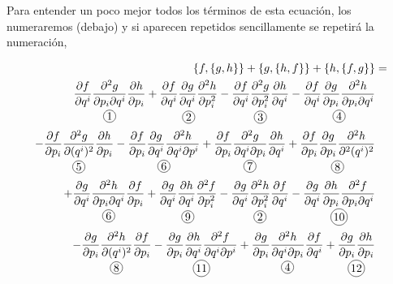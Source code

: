 \documentclass[a4paper,10pt]{article}
\numberwithin{equation}{section}
\newcommand{\circled}[2][]{%
  \tikz[baseline=(char.base)]{%
    \node[shape = circle, draw, inner sep = 1pt]
    (char) {\phantom{\ifblank{#1}{#2}{#1}}};%
    \node at (char.center) {\makebox[0pt][c]{#2}};}}
\begin{document}
Para entender un poco mejor todos los términos de esta ecuación, los numeraremos
(debajo) y si aparecen repetidos sencillamente se repetirá la numeración,

\begin{align}
\begin{split}
   \{f,\{g,h\}\} + \{g,\{h,f\}\} + \{h,\{f,g\}\} &= \\
 \underset{\circled{1}}{\frac{\partial f}{\partial q^i}
  \frac{\partial^2 g}{\partial p_i\partial q^i}\frac{\partial h}{\partial p_i}} 
  + \underset{\circled{2}}{\frac{\partial f}{\partial q^i}
  \frac{\partial g}{\partial q^i}\frac{\partial^2 h}{\partial p_i^2}} 
  - \underset{\circled{3}}{\frac{\partial f}{\partial q^i}
  \frac{\partial^2 g}{\partial p_i^2}\frac{\partial h}{\partial q^i}}
  -\underset{\circled{4}}{\frac{\partial f}{\partial q^i} 
  \frac{\partial g}{\partial p_i}\frac{\partial^2 h}{\partial p_i \partial q^i}} \\
  - \underset{\circled{5}}{\frac{\partial f}{\partial p_i}\frac{\partial^2 g}{\partial (q^i)^2}
  \frac{\partial h}{\partial p_i}} - \underset{\circled{6}}{\frac{\partial f}{\partial p_i}\frac{\partial g}{\partial q^i}
  \frac{\partial^2 h}{\partial q^i\partial p^i}} + \underset{\circled{7}}{\frac{\partial f}{\partial p_i}\frac{\partial^2 g}{\partial q^i\partial p_i}
  \frac{\partial h}{\partial q^i}} + \underset{\circled{8}}{\frac{\partial f}{\partial p_i}\frac{\partial g}{\partial p_i}
  \frac{\partial^2 h}{\partial^2(q^i)^2}} \\
  + \underset{\circled{6}}{\frac{\partial g}{\partial q^i}
  \frac{\partial^2 h}{\partial p_i\partial q^i}\frac{\partial f}{\partial p_i}}
  + \underset{\circled{9}}{\frac{\partial g}{\partial q^i}
  \frac{\partial h}{\partial q^i}\frac{\partial^2 f}{\partial p_i^2}}
  - \underset{\circled{2}}{\frac{\partial g}{\partial q^i}
  \frac{\partial^2 h}{\partial p_i^2}\frac{\partial f}{\partial q^i}}
  -\underset{\circled{10}}{\frac{\partial g}{\partial q^i} 
  \frac{\partial h}{\partial p_i}\frac{\partial^2 f}{\partial p_i \partial q^i}} \\
   - \underset{\circled{8}}{\frac{\partial g}{\partial p_i}\frac{\partial^2 h}{\partial (q^i)^2}
  \frac{\partial f}{\partial p_i}} - \underset{\circled{11}}{\frac{\partial g}{\partial p_i}\frac{\partial h}{\partial q^i}
  \frac{\partial^2 f}{\partial q^i\partial p^i}} + \underset{\circled{4}}{\frac{\partial g}{\partial p_i}\frac{\partial^2 h}{\partial q^i\partial p_i}
  \frac{\partial f}{\partial q^i}} + \underset{\circled{12}}{\frac{\partial g}{\partial p_i}\frac{\partial h}{\partial p_i}
}
\end{split}
\end{align}
\end{document}
